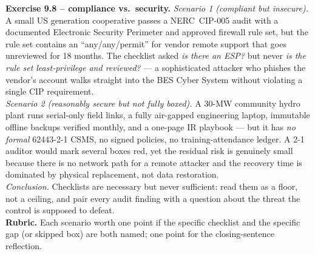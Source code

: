 \documentclass[11pt,a4paper]{article}
\begin{document}
\begin{solutionbox}
\textbf{Exercise 9.8 -- compliance vs.\ security.}
\emph{Scenario 1 (compliant but insecure).} A small US generation cooperative passes a NERC~CIP-005 audit with a documented Electronic Security Perimeter and approved firewall rule set, but the rule set contains an ``any/any/permit'' for vendor remote support that goes unreviewed for 18 months. The checklist asked \emph{is there an ESP?} but never \emph{is the rule set least-privilege and reviewed?} --- a sophisticated attacker who phishes the vendor's account walks straight into the BES Cyber System without violating a single CIP requirement.
\\\emph{Scenario 2 (reasonably secure but not fully boxed).} A 30-MW community hydro plant runs serial-only field links, a fully air-gapped engineering laptop, immutable offline backups verified monthly, and a one-page IR playbook --- but it has \emph{no formal} 62443-2-1 CSMS, no signed policies, no training-attendance ledger. A 2-1 auditor would mark several boxes red, yet the residual risk is genuinely small because there is no network path for a remote attacker and the recovery time is dominated by physical replacement, not data restoration.
\\\emph{Conclusion.} Checklists are necessary but never sufficient: read them as a floor, not a ceiling, and pair every audit finding with a question about the threat the control is supposed to defeat.
\\\textbf{Rubric.} Each scenario worth one point if the specific checklist and the specific gap (or skipped box) are both named; one point for the closing-sentence reflection.
\end{solutionbox}
\end{document}
